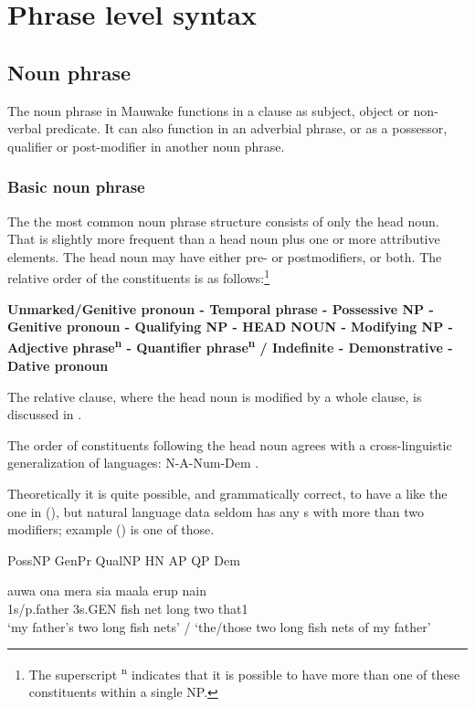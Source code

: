 
\chapter{Phrase level syntax}
{}
\section{Noun phrase}
{}
The noun phrase in Mauwake functions in a clause as subject, object or non-verbal predicate. It can also function in an adverbial phrase, or as a possessor, qualifier or post-modifier in another noun phrase.

\subsection{Basic noun phrase}
{}
The the most common noun phrase structure consists of only the head noun. That is slightly more frequent than a head noun plus one or more attributive elements. The head noun may have either pre- or postmodifiers, or both. The relative order of the  constituents is as follows:\footnote{The superscript \textsuperscript{n} indicates that it is possible to have more than one of these constituents within a single NP.}

{\bfseries
Unmarked/Genitive pronoun - Temporal phrase - Possessive NP - Genitive pronoun - Qualifying NP - HEAD NOUN - Modifying NP - Adjective phrase\textsuperscript{n} - Quantifier phrase\textsuperscript{n} / Indefinite - Demonstrative - Dative pronoun}

The relative clause, where the head noun is modified by a whole clause, is discussed in .

The order of  constituents following the head noun agrees with a cross-linguistic generalization of  languages:  N-A-Num-Dem \citep[112]{Dryer2007a}.

Theoretically it is quite possible, and grammatically correct, to have a  like the one in (), but natural language data seldom has any s with more than two modifiers; example () is one of those.

PossNP  GenPr  QualNP  HN  AP  QP  Dem

\ea%
\label{ex:x392}
\gll auwa  ona  mera  sia  maala  erup  nain \\
1s/p.father  3s.GEN  fish  net  long  two  that1\\
\glt `my father's two long fish nets' / `the/those two long fish nets of my father'
\z



